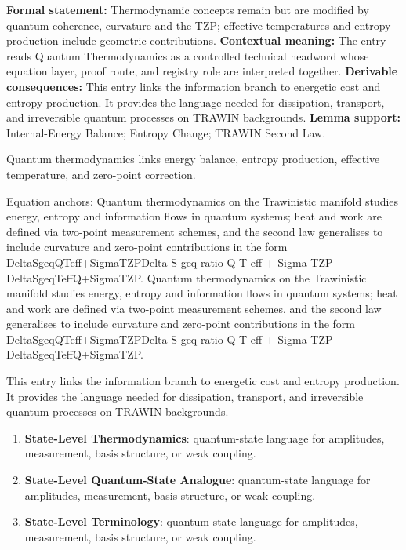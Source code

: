 \begingroup\footnotesize\setlength{\emergencystretch}{3em}\sloppy
\textbf{Formal statement:} Thermodynamic concepts remain but are modified by quantum coherence, curvature and the TZP; effective temperatures and entropy production include geometric contributions. \textbf{Contextual meaning:} The entry reads Quantum Thermodynamics as a controlled technical headword whose equation layer, proof route, and registry role are interpreted together. \textbf{Derivable consequences:} This entry links the information branch to energetic cost and entropy production. It provides the language needed for dissipation, transport, and irreversible quantum processes on TRAWIN backgrounds. \textbf{Lemma support:} Internal-Energy Balance; Entropy Change; TRAWIN Second Law.\par
\endgroup

Quantum thermodynamics links energy balance, entropy production, effective temperature, and zero-point correction.

Equation anchors: Quantum thermodynamics on the Trawinistic manifold studies energy, entropy and information flows in quantum systems; heat and work are defined via two-point measurement schemes, and the second law generalises to include curvature and zero-point contributions in the form DeltaSgeqQTeff+SigmaTZPDelta S geq ratio Q T eff + Sigma TZP DeltaSgeqTeffQ+SigmaTZP. Quantum thermodynamics on the Trawinistic manifold studies energy, entropy and information flows in quantum systems; heat and work are defined via two-point measurement schemes, and the second law generalises to include curvature and zero-point contributions in the form DeltaSgeqQTeff+SigmaTZPDelta S geq ratio Q T eff + Sigma TZP DeltaSgeqTeffQ+SigmaTZP.

This entry links the information branch to energetic cost and entropy production. It provides the language needed for dissipation, transport, and irreversible quantum processes on TRAWIN backgrounds.
\endgroup

\begingroup\footnotesize\sloppy
\begin{enumerate}[leftmargin=1.35em,itemsep=1pt,topsep=1pt,parsep=0pt]
\item \textbf{State-Level Thermodynamics}: quantum-state language for amplitudes, measurement, basis structure, or weak coupling.
\item \textbf{State-Level Quantum-State Analogue}: quantum-state language for amplitudes, measurement, basis structure, or weak coupling.
\item \textbf{State-Level Terminology}: quantum-state language for amplitudes, measurement, basis structure, or weak coupling.
\end{enumerate}
\endgroup

